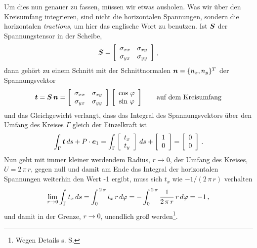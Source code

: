 Um dies nun genauer zu fassen, m\"{u}ssen wir etwas ausholen. Was wir \"{u}ber den Kreisumfang integrieren, sind nicht die horizontalen Spannungen, sondern die horizontalen {\em tractions\/}, um hier das englische Wort zu benutzen. Ist $\vek S$ der Spannungstensor in der Scheibe,
\begin{align}
\vek S =  \left[\barr{r r r} \sigma_{xx} &  \sigma_{xy}\\
  \sigma_{yx} & \sigma_{yy}  \earr\right]\,,
\end{align}
dann geh\"{o}rt zu einem Schnitt mit der Schnittnormalen $\vek n = \{n_x,n_y\}^T$ der Spannungsvektor
\begin{align}\label{PPX}
\vek t = \vek S\,\vek n = \left[\barr{r r r} \sigma_{xx} &  \sigma_{xy}\\
  \sigma_{yx} & \sigma_{yy}  \earr\right]\, \left[\barr{c} \cos\,\Np  \\ \sin\,\Np
  \earr \right] \qquad \text{auf dem Kreisumfang}
\end{align}
und das Gleichgewicht verlangt, dass das Integral des Spannungsvektors \"{u}ber den Umfang des Kreises $\Gamma$ gleich der Einzelkraft ist
\begin{align}\label{Ergebnis}
\int_{\Gamma} \vek t\,ds + P\cdot \vek e_1  =  \int_{\Gamma}  \left [\barr{c}  t_x \\  t_y\earr \right ] \,ds + \left [\barr{c}  1 \\  0\earr \right ]=  \left [\barr{c}  0 \\  0\earr \right ]\,.
\end{align}
Nun geht mit immer kleiner werdendem Radius, $r \to 0$, der Umfang des Kreises, $U = 2\,\pi\,r$, gegen null und damit am Ende das Integral der horizontalen Spannungen weiterhin den Wert -1 ergibt, muss sich $t_x$ wie $-1/(2\,\pi\,r)$ verhalten
\begin{align}
\lim_{r \to 0} \int_{\Gamma}t_x\,ds = \int_0^{\,2\,\pi} t_x\,r\,d\Np = -\int_0^{\,2\,\pi}\frac{1}{2\,\pi\,r}\,r\,d\Np = -1\,,
\end{align}
und damit in der Grenze, $r \to 0$, unendlich gro{\ss} werden\footnote{Wegen Details s. S. \pageref{BeweisP}}.


